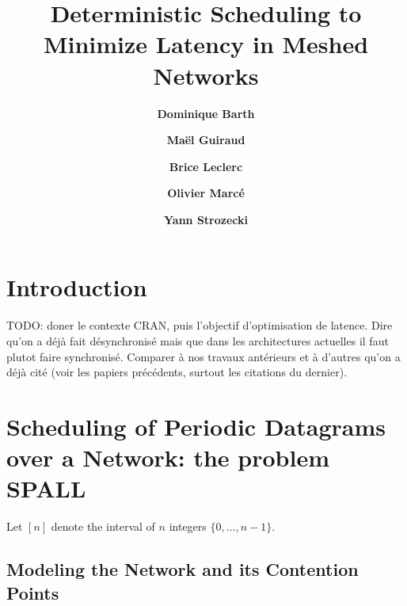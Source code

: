 \documentclass[english]{article}
\begin{document}
\title{ Deterministic Scheduling to Minimize Latency in Meshed Networks}
 

\newcommand{\todo}[1]{{\color{red} TODO: {#1}}}
\newcommand{\spall}{\textsc{SPALL}\xspace}
\newtheorem{theorem}{Theorem}
\newtheorem{lemma}[theorem]{Lemma}
\newtheorem{proposition}[theorem]{Proposition}
\newtheorem{corollary}[theorem]{Corollary}
\newtheorem{definition}{Definition}

\author[1]{\bf{ {Dominique Barth}}}
\author[1,2]{\bf{ {Ma\"el Guiraud}}}
\author[2]{\bf{ {Brice Leclerc}}}
\author[2]{\bf{ {Olivier Marc\'e}}}
\author[1]{\bf{ {Yann Strozecki}}}




\maketitle

\section{Introduction}

TODO: doner le contexte CRAN, puis l'objectif d'optimisation de latence. 
Dire qu'on a déjà fait désynchronisé mais que dans les architectures actuelles il faut plutot faire synchronisé.
Comparer à nos travaux antérieurs et à d'autres qu'on a déjà cité (voir les papiers précédents, surtout les citations du dernier).




\section{Scheduling of Periodic Datagrams over a Network: the problem \spall}


Let $[n]$ denote the interval of $n$ integers $\{0,\dots,n-1\}$.

  \subsection{Modeling the Network and its Contention Points}
\end{document}
